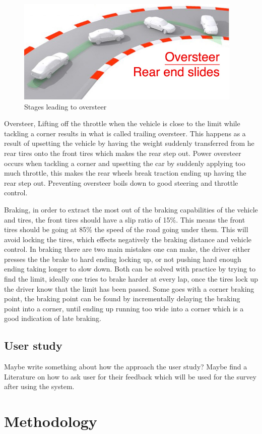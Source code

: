 \documentclass{article}
\begin{document}
\begin{figure}[!htb]
	\centering
	\includegraphics[height=5cm]{oversteer}
	\caption{Stages leading to oversteer}
\label{fig:oversteer}
\end{figure}

Oversteer, Lifting off the throttle when the vehicle is close to the limit while tackling a corner results in what is called trailing oversteer. This happens as a result of upsetting the vehicle by having the weight suddenly transferred from he rear tires onto the front tires which makes the rear step out. Power oversteer occurs when tackling a corner and upsetting the car by suddenly applying too much throttle, this makes the rear wheels break traction ending up having the rear step out. Preventing oversteer boils down to good steering and throttle control.

Braking, in order to extract the most out of the braking capabilities of the vehicle and tires, the front tires should have a slip ratio of 15\%. This means the front tires should be going at 85\% the speed of the road going under them. This will avoid locking the tires, which effects negatively the braking distance and vehicle control. In braking there are two main mistakes one can make, the driver either presses the the brake to hard ending locking up, or not pushing hard enough ending taking longer to slow down. Both can be solved with practice by trying to find the limit, ideally one tries to brake harder at every lap, once the tires lock up the driver know that the limit has been passed. Some goes with a corner braking point, the braking point can be found by incrementally delaying the braking point into a corner, until ending up running too wide into a corner which is a good indication of late braking.



\newpage
\subsection{User study}
Maybe write something about how the approach the user study? Maybe find a Literature on how to ask user for their feedback which will be used for the survey after using the system.

\newpage
\section{Methodology}

\newpage
{}

\end{document}
